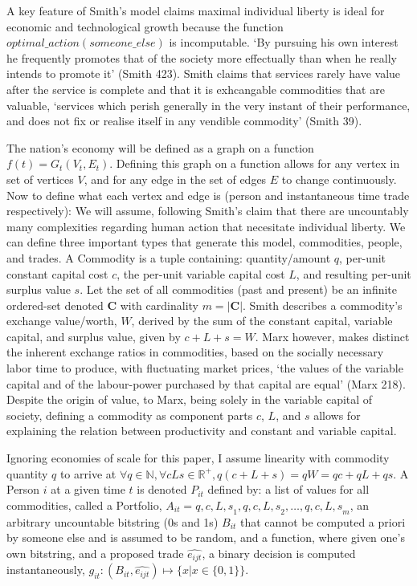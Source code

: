 \documentclass[12pt]{article}
\begin{document}
A key feature of Smith's model claims maximal individual liberty is ideal for economic and technological growth because the function $optimal\_action(someone\_else)$ is incomputable.
`By pursuing his own interest he frequently promotes that of the society more effectually than when he really intends to promote it' (Smith 423).
Smith claims that services rarely have value after the service is complete and that it is exhcangable commodities that are valuable, `services which perish generally in the very instant of their performance, and does not fix or realise itself in any vendible commodity' (Smith 39). \par

The nation's economy will be defined as a graph on a function $f(t) = G_t(V_t, E_t)$. 
Defining this graph on a function allows for any vertex in set of vertices $V$, and for any edge in the set of edges $E$ to change continuously.
Now to define what each vertex and edge is (person and instantaneous time trade respectively): We will assume, following Smith's claim that there are uncountably many complexities regarding human action that necesitate individual liberty. 
We can define three important types that generate this model, commodities, people, and trades.
A Commodity is a tuple containing: quantity/amount $q$, per-unit constant capital cost $c$, the per-unit variable capital cost $L$, and resulting per-unit surplus value $s$. 
Let the set of all commodities (past and present) be an infinite ordered-set denoted $\boldsymbol{C}$ with cardinality $m = |\boldsymbol{C}|$.
Smith describes a commodity's exchange value/worth, $W$, derived by the sum of the constant capital, variable capital, and surplus value, given by $c + L + s = W$. 
Marx however, makes distinct the inherent exchange ratios in commodities, based on the socially necessary labor time to produce, with fluctuating market prices, `the values of the variable capital and of the labour-power purchased by that capital are equal' (Marx 218).
Despite the origin of value, to Marx, being solely in the variable capital of society, defining a commodity as component parts $c$, $L$, and $s$ allows for explaining the relation between productivity and constant and variable capital. \par
Ignoring economies of scale for this paper, I assume linearity with commodity quantity $q$ to arrive at $\forall q \in \mathbb{N}, \forall{cLs} \in \mathbb{R^{+}}, q(c + L + s) = qW = qc + qL + qs $.
A Person $i$ at a given time $t$ is denoted $P_{it}$ defined by: a list of values for all commodities, called a Portfolio, $A_{it} = {{q, c, L, s}_{1}, {q, c, L, s}_{2},\ldots,{q, c, L, s}_{m}}$, an arbitrary uncountable bitstring (0s and 1s) $B_{it}$ that cannot be computed a priori by someone else and is assumed to be random, and a function, where given one's own bitstring, and a proposed trade $\hat{e_{ijt}}$, a binary decision is computed instantaneously, $g_{it} : (B_{it}, \hat{e_{ijt}}) \mapsto \{x | x \in  \{0, 1\}\}$. 
\end{document}
